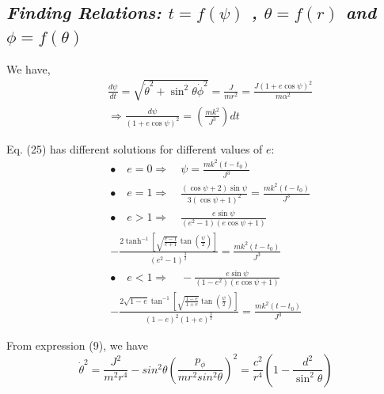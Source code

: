 \documentclass[conference]{IEEEtran}
\begin{document}
\subsection{\normalsize{\emph{\textbf{Finding Relations: $t = f(\psi)$ , $\theta = f(r)$ and $\phi = f(\theta)$}}}}
We have, \begin{equation}
\begin{split}
&\frac{d \psi}{d t} = \sqrt{\dot{\theta}^{2} + \sin^{2}{\theta}\dot{\phi}^{2}} = \frac{J}{mr^{2}} = \frac{J\left(1 + e\cos{\psi}\right)^{2}}{m\alpha^{2}} \\
&\Rightarrow \frac{d \psi}{\left(1 + e\cos{\psi}\right)^{2}} = \left(\frac{mk^{2}}{J^{3}}\right) dt 
\end{split}
\end{equation}

Eq. (25) has different solutions for different values of $e$: 
\begin{equation}
\begin{split}
&\bullet \quad e=0 \Rightarrow \quad \psi = \frac{m k^{2}\left(t - t_{0}\right)}{J^{3}} \\
&\bullet \quad e=1 \Rightarrow \quad \frac{\left(\cos{\psi}+2\right)\sin{\psi}}{3\left(\cos{\psi}+1\right)^{2}} = \frac{m k^{2}\left(t - t_{0}\right)}{J^{3}} \\
&\bullet \quad e>1 \Rightarrow \quad \frac{e\sin{\psi}}{\left(e^{2}-1\right)\left(e\cos{\psi} +1\right)} \\
&-\frac{2\tanh^{-1}{\left[\sqrt{\frac{e-1}{e+1}}\tan{\left(\frac{\psi}{2}\right)}\right]}}{\left(e^{2}-1\right)^{\frac{3}{2}}} =\frac{m k^{2}\left(t - t_{0}\right)}{J^{3}}\\
&\bullet \quad e <1 \Rightarrow \quad -\frac{e\sin{\psi}}{\left(1 - e^{2}\right)\left(e\cos{\psi} +1\right)} \\
&-\frac{2\sqrt{1-e}\tan^{-1}{\left[\sqrt{\frac{1-e}{1+e}}\tan{\left(\frac{\psi}{2}\right)}\right]}}{\left(1-e\right)^{2}\left(1+e\right)^{\frac{3}{2}}} =\frac{m k^{2}\left(t - t_{0}\right)}{J^{3}}
\end{split}
\end{equation}

From expression (9), we have \begin{dmath}\dot{\theta}^{2} =  \frac{J^2}{m^{2}r^{4}} - sin^{2}{\theta}\left(\frac{p_{\phi}}{mr^{2}sin^{2}{\theta}}\right)^{2} = \frac{c^{2}}{r^{4}}\left(1 - \frac{d^{2}}{\sin^{2}{\theta}}\right)\end{dmath} 
\end{document}
